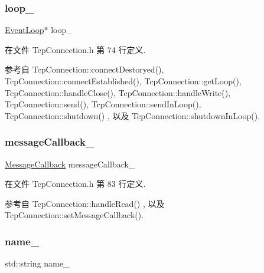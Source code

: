 \subsubsection{\texorpdfstring{loop\+\_\+}{loop\_}}
{\footnotesize\ttfamily \hyperlink{classmuduo_1_1EventLoop}{Event\+Loop}$\ast$ loop\+\_\+\hspace{0.3cm}{\ttfamily [private]}}



在文件 Tcp\+Connection.\+h 第 74 行定义.



参考自 Tcp\+Connection\+::connect\+Destoryed(), Tcp\+Connection\+::connect\+Established(), Tcp\+Connection\+::get\+Loop(), Tcp\+Connection\+::handle\+Close(), Tcp\+Connection\+::handle\+Write(), Tcp\+Connection\+::send(), Tcp\+Connection\+::send\+In\+Loop(), Tcp\+Connection\+::shutdown() , 以及 Tcp\+Connection\+::shutdown\+In\+Loop().

\mbox{\label{classmuduo_1_1TcpConnection_aa4d5ea21d215329779698e634e5e7755}} 
\subsubsection{\texorpdfstring{message\+Callback\+\_\+}{messageCallback\_}}
{\footnotesize\ttfamily \hyperlink{namespacemuduo_ab8a96fa483cffe150618e01058e6fc1b}{Message\+Callback} message\+Callback\+\_\+\hspace{0.3cm}{\ttfamily [private]}}



在文件 Tcp\+Connection.\+h 第 83 行定义.



参考自 Tcp\+Connection\+::handle\+Read() , 以及 Tcp\+Connection\+::set\+Message\+Callback().

\mbox{\label{classmuduo_1_1TcpConnection_a4d739cc5d335052eb9f5b2ca559b81d1}} 
\subsubsection{\texorpdfstring{name\+\_\+}{name\_}}
{\footnotesize\ttfamily std\+::string name\+\_\+\hspace{0.3cm}{\ttfamily [private]}}



